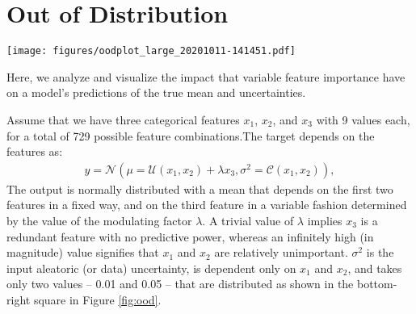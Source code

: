 \iffalse

\section{Out of Distribution}
\label{sec:ood}

\iffalse
\begin{figure*}
\centering
\begin{subfigure}{0.98\textwidth}
    \centering
    \texttt{[image: figures/oodplot\_0\_20201011-042027.pdf]}
    \caption{IQ$_{\textrm{Megacam}}$ x IQ$_{\textrm{MKAM}}$ after dome vent installation. IQ as a function of Wind Direction minus Dome pointing prior to dome vents.}
    \label{fig:my_label}
\end{subfigure}
\hfill
\begin{subfigure}{0.98\textwidth}
    \centering
    \texttt{[image: figures/oodplot\_1\_20201011-042027.pdf]}
    \caption{IQ$_{\textrm{Megacam}}$ x IQ$_{\textrm{MKAM}}$ after dome vent installation. IQ as a function of Wind Direction minus Dome pointing after dome vents.}
    \label{fig:my_label}
\end{subfigure}
\hfill
\begin{subfigure}{0.98\textwidth}
    \centering
    \texttt{[image: figures/oodplot\_8\_20201011-042027.pdf]}
    \caption{IQ$_{\textrm{Megacam}}$ x IQ$_{\textrm{MKAM}}$ after dome vent installation. IQ as a function of Wind Direction minus Dome pointing when dome vents are OPEN or CLOSED.}
    \label{fig:my_label}
\end{subfigure}
\end{figure*}
\fi

\begin{figure*}
    \centering
    \texttt{[image: figures/oodplot\_large\_20201011-141451.pdf]}
    \caption{Caption}
    \label{fig:ood}
\end{figure*}

Here, we analyze and visualize the impact that variable feature importance have on a model's predictions of the true mean and uncertainties. 

Assume that we have three categorical features $x_1$, $x_2$, and $x_3$ with 9 values each, for a total of 729 possible feature combinations.The target depends on the features as:
\begin{align}\label{eq:ood_distribution}
    y = \mathcal{N}\left(\mu=\mathcal{U}(x_1, x_2) + \lambda x_3, \sigma^2=\mathcal{C}(x_1, x_2)\right),
\end{align}
The output is normally distributed with a mean that depends on the first two features in a fixed way, and on the third feature in a variable fashion determined by the value of the modulating factor $\lambda$. A trivial value of $\lambda$ implies $x_3$ is a redundant feature with no predictive power, whereas an infinitely high (in magnitude) value signifies that $x_1$ and $x_2$ are relatively unimportant. $\sigma^2$ is the input aleatoric (or data) uncertainty, is dependent only on $x_1$ and $x_2$, and takes only two values -- 0.01 and 0.05 -- that are distributed as shown in the bottom-right square in Figure \ref{fig:ood}.

